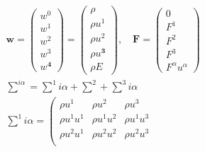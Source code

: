 \documentclass[10pt]{article}
\begin{document}
\[

\begin{aligned}

& \boldsymbol{w}=\left(\begin{array}{l}

w^{0} \\

w^{1} \\

w^{2} \\

w^{3} \\

w^{\mathbf{4}}

\end{array}\right)=\left(\begin{array}{l}

\rho \\

\rho u^{1} \\

\rho u^{2} \\

\rho u^{\mathbf{3}} \\

\rho E

\end{array}\right), \quad \boldsymbol{F}=\left(\begin{array}{l}

0 \\

F^{1} \\

F^{2} \\

F^{3} \\

F^{\alpha} u^{\alpha}

\end{array}\right) \\

& \sum^{i \alpha}=\sum^{1} i \alpha+\sum^{2}+\sum^{3} i \alpha \\

& \sum^{1} i \alpha=\left(\begin{array}{lll}

\rho u^{1} & \rho u^{2} & \rho u^{3} \\

\rho u^{1} u^{1} & \rho u^{1} u^{2} & \rho u^{1} u^{3} \\

\rho u^{2} u^{1} & \rho u^{2} u^{2} & \rho u^{2} u^{3} \\


\end{array}
\end{aligned}\]
\end{document}
